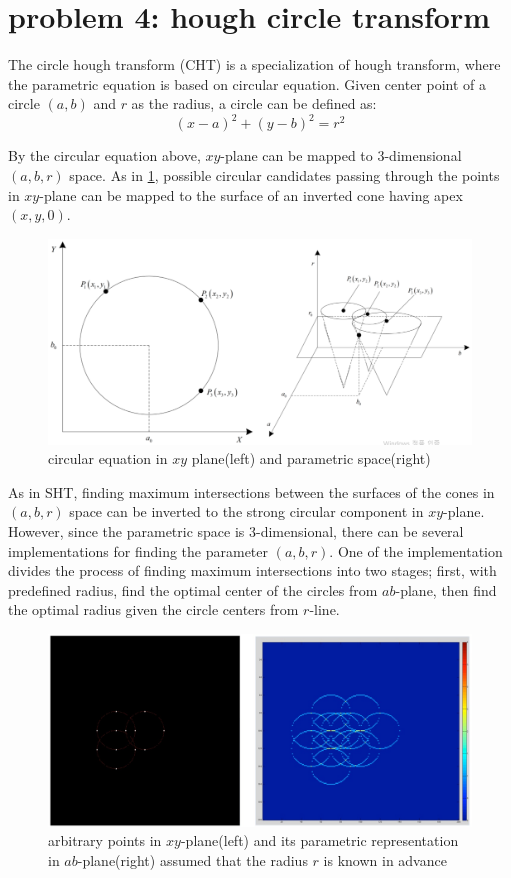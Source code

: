\documentclass[extendedabs]{bmvc2k}
\begin{document}
\section*{problem 4: hough circle transform}

The circle hough transform (CHT) is a specialization of hough transform, where the parametric equation
is based on circular equation. Given center point of a circle $(a, b)$ and $r$ as the radius, a circle
can be defined as:
\[(x-a)^2 + (y-b)^2 = r^2\]

By the circular equation above, $xy$-plane can be mapped to 3-dimensional $(a, b, r)$ space. 
As in \figurename{\ref{fig:6}}, possible circular candidates passing through the points in 
$xy$-plane can be mapped to the surface of an inverted cone having apex $(x, y, 0)$.

\begin{figure}[h]
    \centering
    \includegraphics[width=\linewidth]{hw4_4_1}
    \caption{circular equation in $xy$ plane(left) and parametric space(right)}
    \label{fig:6}
\end{figure}

As in SHT, finding maximum intersections between the surfaces of the cones in $(a, b, r)$ space can be inverted
to the strong circular component in $xy$-plane. However, since the parametric space is 3-dimensional, there can be
several implementations for finding the parameter $(a, b, r)$. One of the implementation divides the process of
finding maximum intersections into two stages; first, with predefined radius, find the optimal center
of the circles from $ab$-plane, then find the optimal radius given the circle centers from $r$-line. 

\begin{figure}[h]
    \centering
    \includegraphics[width=\linewidth]{hw4_4_2}
    \caption{arbitrary points in $xy$-plane(left) and its parametric representation in $ab$-plane(right)
    assumed that the radius $r$ is known in advance}
    \label{fig:7}
\end{figure}
\end{document}
